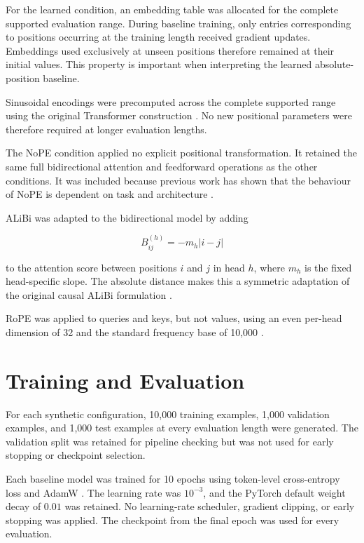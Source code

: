 \documentclass[
    author={Aanchala Ravindra Bhongade},
    supervisor={Dr. Fernando Moreno-Pino},
    degree={MSc},
    title={Length Generalisation in Transformer-Based Sequence Models: Failure Taxonomy and Mitigation Strategies},
    subtitle={},
    type={},
    year={2026}
]{dissertation}
\begin{document}
For the learned condition, an embedding table was allocated for the complete supported evaluation range. During baseline training, only entries corresponding to positions occurring at the training length received gradient updates. Embeddings used exclusively at unseen positions therefore remained at their initial values. This property is important when interpreting the learned absolute-position baseline.

Sinusoidal encodings were precomputed across the complete supported range using the original Transformer construction
\cite{vaswani2017attention}. No new positional parameters were therefore required at longer evaluation lengths.

The NoPE condition applied no explicit positional transformation. It retained the same full bidirectional attention and feedforward operations as the other conditions. It was included because previous work has shown that the behaviour of NoPE is dependent on task and architecture \cite{kazemnejad2023impact}.

ALiBi was adapted to the bidirectional model by adding

\[
B^{(h)}_{ij}=-m_h |i-j|
\]

to the attention score between positions \(i\) and \(j\) in head \(h\), where \(m_h\) is the fixed head-specific slope. The absolute distance makes this a symmetric adaptation of the original causal ALiBi formulation \cite{press2022train}.

RoPE was applied to queries and keys, but not values, using an even
per-head dimension of 32 and the standard frequency base of 10,000 \cite{su2021roformer}.

\section{Training and Evaluation}
\label{sec:training-procedure}

For each synthetic configuration, 10,000 training examples, 1,000 validation examples, and 1,000 test examples at every evaluation length were generated. The validation split was retained for pipeline checking but was not used for early stopping or checkpoint selection.

Each baseline model was trained for 10 epochs using token-level cross-entropy loss and AdamW \cite{loshchilov2019decoupled}. The learning rate was \(10^{-3}\), and the PyTorch default weight decay of \(0.01\) was retained. No learning-rate scheduler, gradient clipping, or early stopping was applied. The checkpoint from the final epoch was used for every evaluation.
\end{document}
